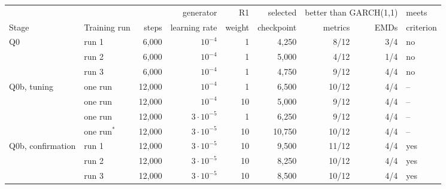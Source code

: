 \begin{tabular}{llrrrrrrl}
\toprule
& & & generator & R1 & selected & \multicolumn{2}{c}{better than GARCH(1,1)} & meets \\
\cmidrule(lr){7-8}
Stage & Training run & steps & learning rate & weight & checkpoint & metrics & EMDs & criterion \\
\midrule
Q0 & run 1 & 6{,}000 & $10^{-4}$ & 1 & 4{,}250 & 8/12 & 3/4 & no \\
 & run 2 & 6{,}000 & $10^{-4}$ & 1 & 5{,}000 & 4/12 & 1/4 & no \\
 & run 3 & 6{,}000 & $10^{-4}$ & 1 & 4{,}750 & 9/12 & 4/4 & no \\
\addlinespace
Q0b, tuning & one run & 12{,}000 & $10^{-4}$ & 1 & 6{,}500 & 10/12 & 4/4 & -- \\
 & one run & 12{,}000 & $10^{-4}$ & 10 & 5{,}000 & 9/12 & 4/4 & -- \\
 & one run & 12{,}000 & $3\cdot 10^{-5}$ & 1 & 6{,}250 & 9/12 & 4/4 & -- \\
 & one run$^{\ast}$ & 12{,}000 & $3\cdot 10^{-5}$ & 10 & 10{,}750 & 10/12 & 4/4 & -- \\
\addlinespace
Q0b, confirmation & run 1 & 12{,}000 & $3\cdot 10^{-5}$ & 10 & 9{,}500 & 11/12 & 4/4 & yes \\
 & run 2 & 12{,}000 & $3\cdot 10^{-5}$ & 10 & 8{,}250 & 10/12 & 4/4 & yes \\
 & run 3 & 12{,}000 & $3\cdot 10^{-5}$ & 10 & 8{,}500 & 10/12 & 4/4 & yes \\
\bottomrule
\end{tabular}
